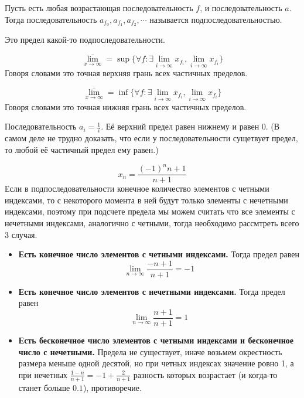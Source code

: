 \begin{definition}[Подпоследовательность]
	Пусть есть любая возрастающая последовательность $f$, и последовательность $a$. Тогда последовательность $a_{f_0}, a_{f_1}, a_{f_2}, \cdots$ называется подпоследовательностью.
\end{definition}

\begin{definition}
	Это предел какой-то подпоследовательности.
\end{definition}


\begin{definition}
	\[\overline{ \lim_{x \rightarrow \infty}} = \sup \{ \forall f: \exists \lim_{i \rightarrow \infty} x_{f_i}, \lim_{i \rightarrow \infty} x_{f_i}\}\]
	Говоря словами это точная верхняя грань всех частичных пределов.
\end{definition}


\begin{definition}
	\[\overline{ \lim_{x \rightarrow \infty}} = \inf \{ \forall f: \exists \lim_{i \rightarrow \infty} x_{f_i}, \lim_{i \rightarrow \infty} x_{f_i}\}\]
	Говоря словами это точная нижняя грань всех частичных пределов.
\end{definition}


\begin{examples}
	Последовательность $a_i = \frac1i$. Её верхний предел равен нижнему и равен 0. (В самом деле не трудно доказать, что если у последовательности сущетвует предел, то любой её частичный предел ему равен.)
\end{examples}


\begin{examples}
	\[x_n = \frac{(-1)^n n + 1}{n + 1}\]
	Если в подпоследовательности конечное количество элементов с четными индексами, то с некоторого момента в ней будут только элементы с нечетными индексами, поэтому при подсчете предела мы можем считать что все элементы с нечетными индексами, аналогично с четными, тогда необходимо рассмтреть всего 3 случая.

	\begin{itemize}
		\item \textbf{Есть конечное число элементов с четными индексами.} Тогда предел равен \[\lim_{n \rightarrow \infty} \frac{-n + 1}{n + 1} = -1\]
		\item \textbf{Есть конечное число элементов с нечетными индексами.} Тогда предел равен \[\lim_{n \rightarrow \infty} \frac{n + 1}{n + 1} = 1\]
		\item \textbf{Есть бесконечное число элементов с четными индексами и бесконечное число с нечетными.} Предела не существует, иначе возьмем окрестность размера меньше одной десятой, но при четных индексах значение ровно 1, а при нечетных $\frac{1 - n}{n + 1} = -1 + \frac{2}{n + 1}$ разность которых возрастает (и когда-то станет больше $0.1$), противоречие.
	\end{itemize}
\end{examples}
